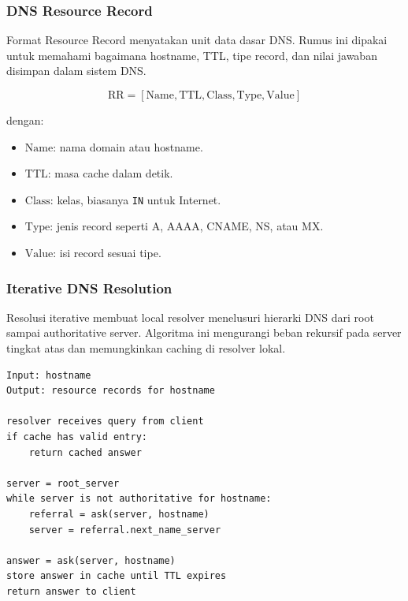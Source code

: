 \subsubsection{DNS Resource Record}
\begin{jawab}
Format Resource Record menyatakan unit data dasar DNS. Rumus ini dipakai untuk memahami bagaimana hostname, TTL, tipe record, dan nilai jawaban disimpan dalam sistem DNS.
\end{jawab}

\begin{equation}
    \text{RR} = [\text{Name}, \text{TTL}, \text{Class}, \text{Type}, \text{Value}]
    \label{eq:dns-rr}
\end{equation}

dengan:
\begin{itemize}
    \item $\text{Name}$: nama domain atau hostname.
    \item $\text{TTL}$: masa cache dalam detik.
    \item $\text{Class}$: kelas, biasanya \texttt{IN} untuk Internet.
    \item $\text{Type}$: jenis record seperti A, AAAA, CNAME, NS, atau MX.
    \item $\text{Value}$: isi record sesuai tipe.
\end{itemize}

\subsubsection{Iterative DNS Resolution}
\begin{jawab}
Resolusi iterative membuat local resolver menelusuri hierarki DNS dari root sampai authoritative server. Algoritma ini mengurangi beban rekursif pada server tingkat atas dan memungkinkan caching di resolver lokal.
\end{jawab}

\begin{lstlisting}[caption={Pseudocode iterative DNS resolution}, label={lst:dns-iterative}]
Input: hostname
Output: resource records for hostname

resolver receives query from client
if cache has valid entry:
    return cached answer

server = root_server
while server is not authoritative for hostname:
    referral = ask(server, hostname)
    server = referral.next_name_server

answer = ask(server, hostname)
store answer in cache until TTL expires
return answer to client
\end{lstlisting}

